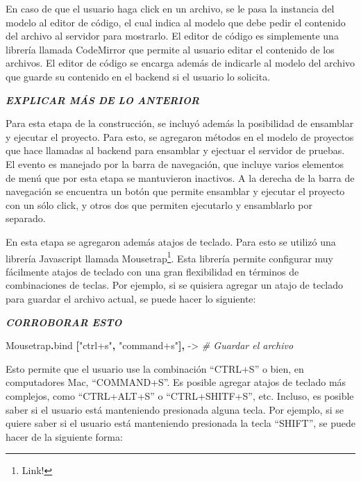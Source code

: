 \documentclass[12pt,titlepage,]{article}
\newenvironment{Shaded}{}{}
\newcommand{\KeywordTok}[1]{\textcolor[rgb]{0.00,0.44,0.13}{\textbf{{#1}}}}
\newcommand{\StringTok}[1]{\textcolor[rgb]{0.25,0.44,0.63}{{#1}}}
\newcommand{\CommentTok}[1]{\textcolor[rgb]{0.38,0.63,0.69}{\textit{{#1}}}}
\newcommand{\FunctionTok}[1]{\textcolor[rgb]{0.02,0.16,0.49}{{#1}}}
\newcommand{\NormalTok}[1]{{#1}}
\begin{document}
En caso de que el usuario haga click en un archivo, se le pasa la
instancia del modelo al editor de código, el cual indica al modelo que
debe pedir el contenido del archivo al servidor para mostrarlo. El
editor de código es simplemente una librería llamada CodeMirror que
permite al usuario editar el contenido de los archivos. El editor de
código se encarga además de indicarle al modelo del archivo que guarde
su contenido en el backend si el usuario lo solicita.

\textbf{\emph{EXPLICAR MÁS DE LO ANTERIOR}}

Para esta etapa de la construcción, se incluyó además la posibilidad de
ensamblar y ejecutar el proyecto. Para esto, se agregaron métodos en el
modelo de proyectos que hace llamadas al backend para ensamblar y
ejectuar el servidor de pruebas. El evento es manejado por la barra de
navegación, que incluye varios elementos de menú que por esta etapa se
mantuvieron inactivos. A la derecha de la barra de navegación se
encuentra un botón que permite ensamblar y ejecutar el proyecto con un
sólo click, y otros dos que permiten ejecutarlo y ensamblarlo por
separado.

En esta etapa se agregaron además atajos de teclado. Para esto se
utilizó una librería Javascript llamada Mousetrap\footnote{Link!}. Esta
librería permite configurar muy fácilmente atajos de teclado con una
gran flexibilidad en términos de combinaciones de teclas. Por ejemplo,
si se quisiera agregar un atajo de teclado para guardar el archivo
actual, se puede hacer lo siguiente:

\textbf{\emph{CORROBORAR ESTO}}

\begin{Shaded}
\begin{Highlighting}[]
\NormalTok{Mousetrap}\KeywordTok{.}\NormalTok{bind }\KeywordTok{[}\StringTok{"ctrl+s"}\KeywordTok{,} \StringTok{"command+s"}\KeywordTok{],} \FunctionTok{->}
  \CommentTok{# Guardar el archivo}
\end{Highlighting}
\end{Shaded}

Esto permite que el usuario use la combinación ``CTRL+S'' o bien, en
computadores Mac, ``COMMAND+S''. Es posible agregar atajos de teclado
más complejos, como ``CTRL+ALT+S'' o ``CTRL+SHITF+S'', etc. Incluso, es
posible saber si el usuario está manteniendo presionada alguna tecla.
Por ejemplo, si se quiere saber si el usuario está manteniendo
presionada la tecla ``SHIFT'', se puede hacer de la siguiente forma:
\end{document}
